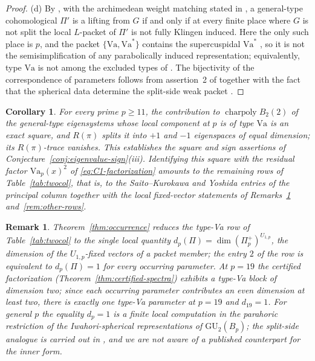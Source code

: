 \documentclass[10pt,a4paper]{amsart}
\newtheorem{corollary}[theorem]{Corollary}
\newtheorem{remark}[theorem]{Remark}
\newcommand{\GU}{\mathrm{GU}}
\newcommand{\Va}{\mathrm{Va}}
\DeclareMathOperator{\charp}{charpoly}
\providecommand{\Va}{\mathrm{Va}}
\providecommand{\charp}{\operatorname{charpoly}}
\begin{document}
\begin{proof}
		\textup{(d)} By \cite[Thm.~11.4(4)]{RoesnerWeissauer2021}, with the
		archimedean weight matching stated in
		\cite[Cor.~11.7]{RoesnerWeissauer2021}, a general-type cohomological
		$\Pi'$ is a lifting from $G$ if and only if at every finite place
		where $G$ is not split the local $L$-packet of $\Pi'$ is not fully
		Klingen induced. Here the only such place is $p$, and the packet
		$\{\Va,\Va^{*}\}$ contains the supercuspidal $\Va^{*}$
		\cite[\S3]{Schmidt2018}, so it is not the semisimplification of any
		parabolically induced representation; equivalently, type $\Va$ is
		not among the excluded types of
		\cite[Cor.~11.7]{RoesnerWeissauer2021}. The bijectivity of the
		correspondence of parameters follows from assertion~2 of
		\cite[Thm.~11.4]{RoesnerWeissauer2021} together with the fact that
		the spherical data determine the split-side weak packet
		\cite[Prop.~10.1(6)]{RoesnerWeissauer2021}.
	\end{proof}

	
	\begin{corollary}
		\label{cor:conj-iii}
		For every prime $p\ge11$, the contribution to $\charp B_2(2)$ of
		the general-type eigensystems whose local component at $p$ is of
		type $\Va$ is an exact square, and $R(\pi)$ splits it into $+1$ and
		$-1$ eigenspaces of equal dimension; its $R(\pi)$-trace vanishes.
		This establishes the square and sign assertions of
		Conjecture~\ref{conj:eigenvalue-sign}\textup{(iii)}. Identifying
		this square with the residual factor $\Va_p(x)^2$ of
		\eqref{eq:C1-factorization} amounts to the remaining rows of
		Table~\ref{tab:twocol}, that is, to the Saito--Kurokawa and Yoshida
		entries of the principal column together with the local
		fixed-vector statements of Remarks~\ref{rem:local-constant}
		and~\ref{rem:other-rows}.
	\end{corollary}
	
	\begin{remark}\label{rem:local-constant}
		Theorem~\ref{thm:occurrence} reduces the type-Va row of
		Table~\ref{tab:twocol} to the single local quantity
		$d_p(\Pi)=\dim(\Pi_p^+)^{U_{1,p}}$, the dimension of the
		$U_{1,p}$-fixed vectors of a packet member; the entry $2$ of the
		row is equivalent to $d_p(\Pi)=1$ for every occurring parameter. At
		$p=19$ the certified factorization
		(Theorem~\ref{thm:certified-spectra}) exhibits a type-Va block of
		dimension two; since each occurring parameter contributes an even
		dimension at least two, there is exactly one type-Va parameter at
		$p=19$ and $d_{19}=1$. For general $p$ the equality $d_p=1$ is a
		finite local computation in the parahoric restriction of the
		Iwahori-spherical representations of $\GU_2(B_p)$; the split-side
		analogue is carried out in \cite{Roesner2016}, and we are not aware
		of a published counterpart for the inner form.
	\end{remark}
	
\end{document}
